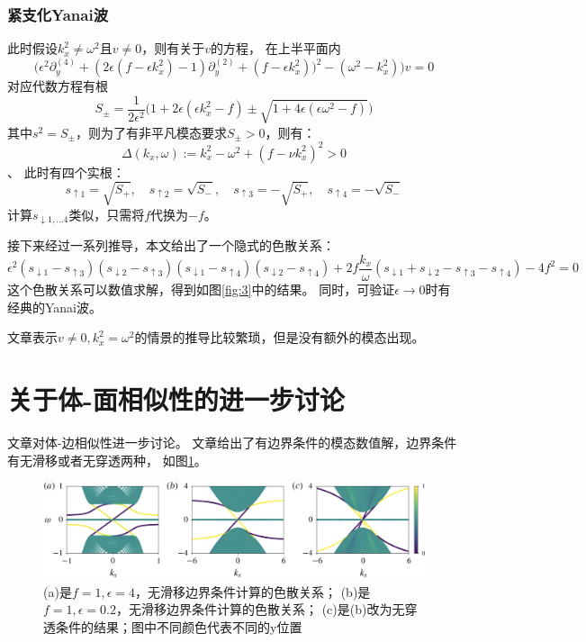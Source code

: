 \documentclass[UTF8,zihao=5]{ctexart} %
\begin{document}
\subsubsection{紧支化Yanai波}
此时假设$k^2_x\neq\omega^2$且$v\neq 0$，则有关于$v$的方程，
在上半平面内
\begin{equation}\label{eq:yanai_v_order4}
    \Big(\epsilon ^2 \partial^{(4)}_{y}  + (2\epsilon ( f-\epsilon  k_x^2)-1) \partial^{(2)}_{y} + ( f-\epsilon  k_x^2))^2-(\omega^2-k_x^2)\Big)v = 0
\end{equation}
对应代数方程有根
\begin{equation}\label{eq:def_Spm}
    S_\pm = \dfrac{1}{2\epsilon ^2} \Big( 1+2\epsilon (\epsilon  k_x^2- f) \pm \sqrt{1+4 \epsilon  (\epsilon  \omega^2-f)} \Big)
\end{equation}
其中$s^2=S_\pm$，则为了有非平凡模态要求$S_\pm>0$，则有：
\begin{equation}\label{eq:interface_bulk_limit}
    \Delta(k_x,\omega) := k_x^2-\omega^2 + (f-\nu k_x^2)^2 > 0
\end{equation}、
此时有四个实根：
\begin{equation}
    s_{\uparrow1} = \sqrt{S_+}, \quad s_{\uparrow2} = \sqrt{S_-}, \quad s_{\uparrow3} = -\sqrt{S_+}, \quad s_{\uparrow4} = -\sqrt{S_-}
\end{equation}
计算$s_{\downarrow1,...4}$类似，只需将$f$代换为$-f$。

接下来经过一系列推导，本文给出了一个隐式的色散关系：
\begin{equation}\label{eq:Yanai_implicit}
    \epsilon ^2(s_{\downarrow 1}-s_{\uparrow 3})(s_{\downarrow 2}-s_{\uparrow 3})(s_{\downarrow 1}-s_{\uparrow 4})(s_{\downarrow 2}-s_{\uparrow 4}) + 2 f \dfrac{k_x}{\omega} (s_{\downarrow 1}+ s_{\downarrow 2}-s_{\uparrow 3} - s_{\uparrow 4}) - 4 f^2 = 0
\end{equation}
这个色散关系可以数值求解，得到如图\ref{fig:3}中的结果。
同时，可验证$\epsilon\rightarrow0$时有经典的Yanai波。

文章表示$v\neq0, k_x^2=\omega^2$的情景的推导比较繁琐，但是没有额外的模态出现。

\section{关于体-面相似性的进一步讨论}

文章对体-边相似性进一步讨论。
文章给出了有边界条件的模态数值解，边界条件有无滑移或者无穿透两种，
如图\ref{fig:4}。

\begin{figure}[H]
    \centering
    \includegraphics[width=16cm]{fig4.png}  %
    \caption{(a)是$f=1,\epsilon=4$，无滑移边界条件计算的色散关系；
        (b)是$f=1,\epsilon=0.2$，无滑移边界条件计算的色散关系；
        (c)是(b)改为无穿透条件的结果；图中不同颜色代表不同的y位置}
    \label{fig:4}
\end{figure}
\end{document}
